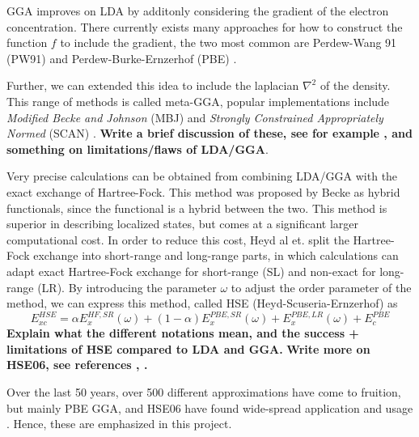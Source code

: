 GGA improves on LDA by additonly considering the gradient of the electron concentration. There currently exists many approaches for how to construct the function $f$ to include the gradient, the two most common are Perdew-Wang 91 (PW91) \cite{pw91} and Perdew-Burke-Ernzerhof (PBE) \cite{pbe}. 

Further, we can extended this idea to include the laplacian $\nabla^2$ of the density. This range of methods is called meta-GGA, popular implementations include \textit{Modified Becke and Johnson} (MBJ) \cite{mbj} and \textit{Strongly Constrained Appropriately Normed} (SCAN) \cite{scan}. \textbf{Write a brief discussion of these, see for example \cite{scan2}, and something on limitations/flaws of LDA/GGA}.

Very precise calculations can be obtained from combining LDA/GGA with the exact exchange of Hartree-Fock. This method was proposed by Becke as hybrid functionals, since the functional is a hybrid between the two. This method is superior in describing localized states, but comes at a significant larger computational cost. In order to reduce this cost, Heyd al et. split the Hartree-Fock exchange into short-range and long-range parts, in which calculations can adapt exact Hartree-Fock exchange for short-range (SL) and non-exact for long-range (LR). By introducing the parameter $\omega$ to adjust the order parameter of the method, we can express this method, called HSE (Heyd-Scuseria-Ernzerhof) \cite{hse06} as
\begin{equation}
    E_{xc}^{HSE} = \alpha E_{x}^{HF,SR}(\omega) + (1-\alpha)E_{x}^{PBE, SR}(\omega) + E_x^{PBE,LR}(\omega) + E_{c}^{PBE}
\end{equation}
\textbf{Explain what the different notations mean, and the success + limitations of HSE compared to LDA and GGA.}
\textbf{Write more on HSE06, see references \cite{hf_bandgap}, \cite{hf_comparision}. \cite{hse}}

Over the last 50 years, over 500 different approximations have come to fruition, but mainly PBE GGA, and HSE06 have found wide-spread application and usage \cite{XC_bandgap}. Hence, these are emphasized in this project. 

